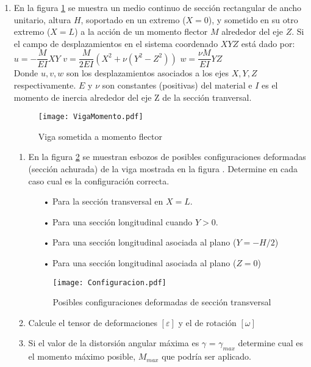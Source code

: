 \documentclass[../notas medios.tex]{subfiles}
\begin{document}
\begin{enumerate}
\item  \label{punto05_d}  En la figura \cref{VigaMomentoflec} se muestra un medio continuo de sección rectangular de ancho unitario, altura $H$, soportado en un extremo ($X = 0$), y sometido en su otro extremo ($X = L$) a la acci\'on de un momento flector $M$ alrededor del eje $Z$. Si el campo de desplazamientos en el sistema coordenado $XYZ$ est\'a dado por: \\

	$u= -\dfrac{M}{EI} X Y $ \hspace*{10mm}	
	$v= \dfrac{M}{2EI}(X^2+ \nu (Y^2-Z^2)) $ \hspace*{10mm}	
	$w= \dfrac{\nu M}{EI} Y Z  $\\


Donde $u,v,w$ son los desplazamientos asociados a los ejes $X,Y,Z$ respectivamente. $E$ y $\nu$ son constantes  (positivas) del material e $I$ es el momento de inercia alrededor del eje Z de la secci\'on tranversal. \\ 
\begin{figure}[H]
	\centering
	\texttt{[image: VigaMomento.pdf]}
	\caption{Viga sometida a momento flector}
	 \label{VigaMomentoflec}
\end{figure}
%
\begin{enumerate}
\item En la figura \cref{ConfiguraFlector} se muestran esbozos de posibles configuraciones deformadas (secci\'on achurada) de la viga mostrada en la figura \label{VigaMomento}. Determine en cada caso cual es la configuración correcta. 
%
\begin{enumerate}
%
	\item[•] Para la secci\'on transversal en $X = L$. 
	\item[•] Para una secci\'on longitudinal cuando $Y > 0$.
	\item[•]  Para una secci\'on longitudinal asociada al plano ($Y = -H/2$)
	\item[•]  Para una secci\'on longitudinal asociada al plano ($Z = 0$) 
%
\end{enumerate}
%
\begin{figure}[H]
	\centering
	\texttt{[image: Configuracion.pdf]}
	\caption{Posibles configuraciones deformadas de secci\'on transversal}
	\label{ConfiguraFlector}
\end{figure}
%
\item Calcule el tensor de deformaciones  $[\varepsilon]$ y el de rotación $[\omega]$ 
\item Si el valor de la distorsi\'on angular m\'axima es $\gamma$ = $\gamma_{max}$ determine cual es el momento m\'aximo posible, $M_{max}$ que podría ser aplicado. 

\end{enumerate}
\end{enumerate}
\end{document}
